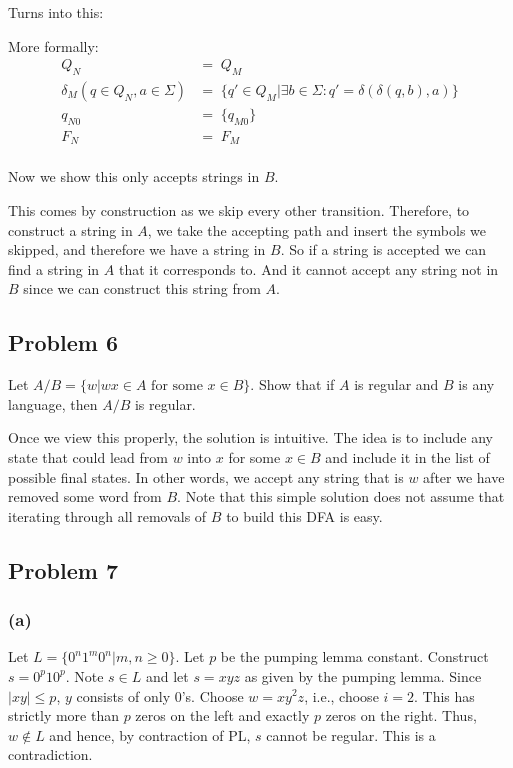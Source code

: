 \documentclass[english]{article}
\begin{document}
Turns into this:


More formally:
\begin{align*}
                              Q_N &=\; Q_M \\
 \delta_M(q \in Q_N,a \in \Sigma) &=\; \{ q' \in Q_M | \exists b \in \Sigma : q' = \delta(\delta(q,b),a) \} \\
                           q_{N0} &=\; \{q_{M0}\} \\
                              F_N &=\; F_M \\
\end{align*}

Now we show this only accepts strings in $B$. 

This comes by construction as we skip every other transition. Therefore, to construct a string in $A$, we take the accepting path and insert the symbols we skipped, and therefore we have a string in $B$. So if a string is accepted we can find a string in $A$ that it corresponds to. And it cannot accept any string not in $B$ since we can construct this string from $A$. 

\subsection*{Problem 6}
Let $A/B = \{w|wx \in A \text{ for some } x \in B\}$. Show that if $A$ is regular and $B$ is any language, then $A/B$ is regular.

Once we view this properly, the solution is intuitive. The idea is to include any state that could lead from $w$ into $x$ for some $x \in B$ and include it in the list of possible final states. In other words, we accept any string that is $w$ after we have removed some word from $B$. Note that this simple solution does not assume that iterating through all removals of $B$ to build this DFA is easy.

\subsection*{Problem 7}
\subsubsection*{(a)}
Let $L = \{0^n 1^m 0^n | m,n \geq 0\}$. Let $p$ be the pumping lemma constant. Construct $s = 0^p 1 0^p$.
Note $s \in L$ and let $s = xyz$ as given by the pumping lemma.
Since $|xy| \leq p$, $y$ consists of only $0$'s. Choose $w = xy^2 z$, i.e., choose $i=2$. This has strictly more than $p$ zeros on the left and exactly $p$ zeros on the right. Thus, $w \notin L$ and hence, by contraction of PL, $s$ cannot be regular. This is a contradiction.
\end{document}
